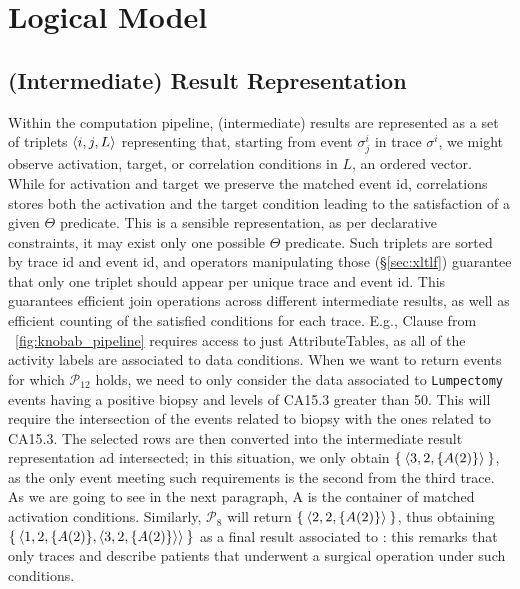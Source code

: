 \section{Logical Model}

\subsection{(Intermediate) Result Representation}
Within the computation pipeline, (intermediate) results are represented as a set of triplets $\braket{i,j,L}$ representing that, starting from event $\sigma^i_j$ in trace $\sigma^i$, we might observe activation, target, or correlation conditions in $L$, an ordered vector.  While for activation and target 
we 
preserve 
the matched event id,
correlations stores
both the activation and the target condition leading to the satisfaction of a given $\Theta$ predicate. This is a sensible representation, as per declarative constraints, it may exist only one possible $\Theta$ predicate. Such triplets are sorted by trace id and event id, and operators manipulating those (\S\ref{sec:xltlf}) guarantee that only one triplet should appear per unique trace and event id. This guarantees efficient join operations across different intermediate results, as well as efficient counting of the satisfied conditions for each trace. %
E.g., Clause  from \figurename~\ref{fig:knobab_pipeline} requires access to just \textsf{AttributeTable}s, as all of the activity labels are associated to data conditions. When we want to return events for which $\mathcal{P}_{12}$ holds, we need to only consider the data associated to \texttt{Lumpectomy} events having a positive biopsy and levels of CA15.3 greater than 50. This will require the intersection of the events related to biopsy with the ones related to CA15.3. The selected rows are then  converted into the intermediate result representation ad intersected; in this situation, we only obtain $\Set{\braket{3,2,\{A(2)\}}}$, as the only event meeting such requirements is the second from the third trace. 
As we are going to see in the next paragraph, A is the container of matched activation conditions. 
Similarly, $\mathcal{P}_{8}$ will return $\Set{\braket{2,2,\{A(2)\}}}$, thus obtaining $\Set{\braket{1,2,\{A(2)\},\braket{3,2,\{A(2)\}}}}$ as a final result associated to : this remarks that only traces  and  describe patients that underwent a surgical operation under such conditions.

